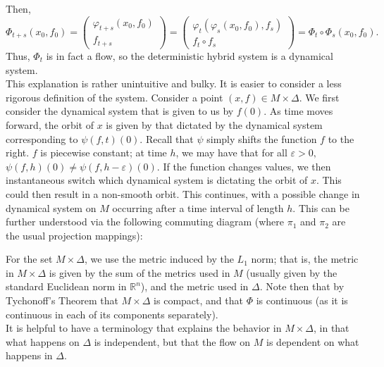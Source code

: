 \documentclass[11pt]{article}
\begin{document}
Then,
$$\Phi_{t+s}(x_0,f_0) 
= 
\left (
\begin{array}{cc}
\varphi_{t+s} (x_0, f_0) \\
f_{t+s}
\end{array} \right ) 
 = 
\left (
\begin{array}{cc}
\varphi_t (\varphi_s(x_0, f_0), f_s) \\
f_t \circ f_s
\end{array} \right ) 
= 
\Phi_t \circ \Phi_s(x_0,f_0) .$$
Thus, $\Phi_t$ is in fact a flow, so the deterministic hybrid system is a dynamical system.\\
\indent This explanation is rather unintuitive and bulky.  It is easier to consider a less rigorous definition of the system.  Consider a point $(x,f)\in M\times\Delta.$  We first consider the dynamical system that is given to us by $f(0)$.  As time moves forward, the orbit of $x$ is given by that dictated by the dynamical system corresponding to $\psi(f,t)(0)$.  Recall that $\psi$ simply shifts the function $f$ to the right.  $f$ is piecewise constant; at time $h$, we may have that for all $\varepsilon>0,$ $\psi(f,h)(0)\not = \psi(f,h-\varepsilon)(0).$  If the function changes values, we then instantaneous switch which dynamical system is dictating the orbit of $x$.  This could then result in a non-smooth orbit.  This continues, with a possible change in dynamical system on $M$ occurring after a time interval of length $h$. This can be further understood via the following commuting diagram (where $\pi_1$ and $\pi_2$ are the usual projection mappings):
\begin{center}
\end{center}

\indent For the set $M\times\Delta$, we use the metric induced by the \textbf{$L_1$} norm; that is, the metric in $M\times \Delta$ is given by the sum of the metrics used in $M$ (usually given by the standard Euclidean norm in $\mathbb{R}^n$), and the metric used in $\Delta$.  Note then that by Tychonoff's  Theorem that $M\times \Delta$ is compact, and that $\Phi$ is continuous (as it is continuous in each of its components separately).  \\
\indent It is helpful to have a terminology that explains the behavior in $M\times\Delta$, in that what happens on $\Delta$ is independent, but that the flow on $M$ is dependent on what happens in $\Delta$.  
\end{document}
